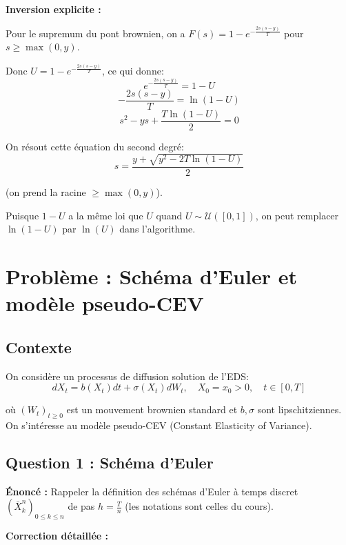 \documentclass[12pt,a4paper]{article}
\theoremstyle{definition}
\begin{document}
\textbf{Inversion explicite :}

Pour le supremum du pont brownien, on a $F(s) = 1 - e^{-\frac{2s(s-y)}{T}}$ pour $s \geq \max(0,y)$.

Donc $U = 1 - e^{-\frac{2s(s-y)}{T}}$, ce qui donne:
\[
e^{-\frac{2s(s-y)}{T}} = 1 - U
\]
\[
-\frac{2s(s-y)}{T} = \ln(1-U)
\]
\[
s^2 - ys + \frac{T\ln(1-U)}{2} = 0
\]

On résout cette équation du second degré:
\[
s = \frac{y + \sqrt{y^2 - 2T\ln(1-U)}}{2}
\]

(on prend la racine $\geq \max(0,y)$).

\begin{astuce}
Puisque $1-U$ a la même loi que $U$ quand $U \sim \mathcal{U}([0,1])$, on peut remplacer $\ln(1-U)$ par $\ln(U)$ dans l'algorithme.
\end{astuce}

\section{Problème : Schéma d'Euler et modèle pseudo-CEV}

\subsection{Contexte}

On considère un processus de diffusion solution de l'EDS:
\[
dX_t = b(X_t)dt + \sigma(X_t)dW_t, \quad X_0 = x_0 > 0, \quad t \in [0,T]
\]

où $(W_t)_{t \geq 0}$ est un mouvement brownien standard et $b, \sigma$ sont lipschitziennes. On s'intéresse au modèle pseudo-CEV (Constant Elasticity of Variance).

\subsection{Question 1 : Schéma d'Euler}

\textbf{Énoncé :} Rappeler la définition des schémas d'Euler à temps discret $(\bar{X}_k^n)_{0 \leq k \leq n}$ de pas $h = \frac{T}{n}$ (les notations sont celles du cours).

\textbf{Correction détaillée :}
\end{document}
